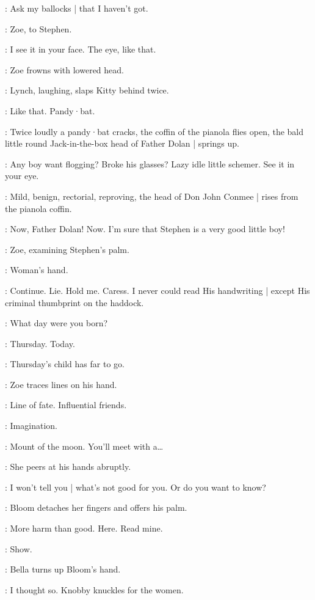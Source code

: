 \Zoe:
Ask my ballocks |
that I haven't got.

:
Zoe,
to Stephen.

\Zoe:
I see it in your face.
The eye,
like that.

:
Zoe frowns with lowered head.

:
Lynch,
laughing,
slaps Kitty behind twice.

\Lynch:
Like that.
Pandy·bat.

:
Twice loudly a pandy·bat cracks,
the coffin of the pianola flies open,
the bald little round Jack-in-the-box head of Father Dolan |
springs up.

\FatherDolan:
Any boy want flogging?
Broke his glasses?
Lazy idle little schemer.
See it in your eye.

:
Mild,
benign,
rectorial,
reproving,
the head of Don John Conmee |
rises from the pianola coffin.

\DonJohnConmee:
Now,
Father Dolan!
Now.
I'm sure that Stephen is a very good little boy!

:
Zoe,
examining Stephen's palm.

\Zoe:
Woman's hand.

\Stephen:
Continue.
Lie.
Hold me.
Caress.
I never could read His handwriting |
except His criminal thumbprint on the haddock.

\Zoe:
What day were you born?

\Stephen:
Thursday.
Today.

\Zoe:
Thursday's child has far to go.

:
Zoe traces lines on his hand.

\Zoe:
Line of fate.
Influential friends.

\Florry:
Imagination.

\Zoe:
Mount of the moon.
You'll meet with a…

:
She peers at his hands abruptly.

\Zoe:
I won't tell you |
what's not good for you.
Or do you want to know?

:
Bloom detaches her fingers and offers his palm.

\Bloom:
More harm than good.
Here.
Read mine.

\Bella:
Show.

:
Bella turns up Bloom's hand.

\Bella:
I thought so.
Knobby knuckles for the women.

